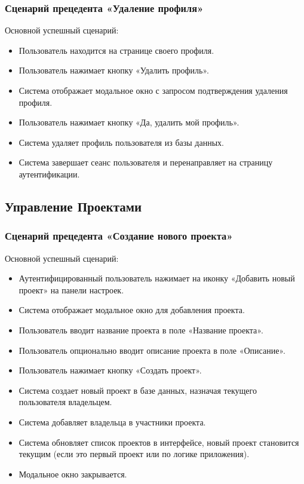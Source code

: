 \subsubsection{Сценарий прецедента «Удаление профиля»}
Основной успешный сценарий:
\begin{itemize}
	\item Пользователь находится на странице своего профиля.
	\item Пользователь нажимает кнопку «Удалить профиль».
	\item Система отображает модальное окно с запросом подтверждения удаления профиля.
	\item Пользователь нажимает кнопку «Да, удалить мой профиль».
	\item Система удаляет профиль пользователя из базы данных.
	\item Система завершает сеанс пользователя и перенаправляет на страницу аутентификации.
\end{itemize}

\subsection*{Управление Проектами}

\subsubsection{Сценарий прецедента «Создание нового проекта»}
Основной успешный сценарий:
\begin{itemize}
	\item Аутентифицированный пользователь нажимает на иконку «Добавить новый проект» на панели настроек.
	\item Система отображает модальное окно для добавления проекта.
	\item Пользователь вводит название проекта в поле «Название проекта».
	\item Пользователь опционально вводит описание проекта в поле «Описание».
	\item Пользователь нажимает кнопку «Создать проект».
	\item Система создает новый проект в базе данных, назначая текущего пользователя владельцем.
	\item Система добавляет владельца в участники проекта.
	\item Система обновляет список проектов в интерфейсе, новый проект становится текущим (если это первый проект или по логике приложения).
	\item Модальное окно закрывается.
\end{itemize}

